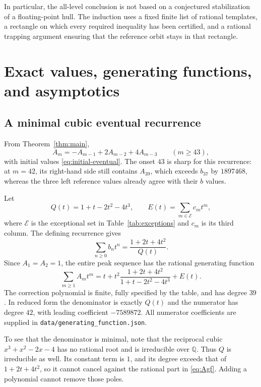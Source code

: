 \documentclass[11pt,a4paper]{article}
\theoremstyle{definition}\newtheorem{definition}[theorem]{Definition}
\theoremstyle{remark}\newtheorem{remark}[theorem]{Remark}
\newcommand{\Q}{\mathbb Q}
\begin{document}
In particular, the all-level conclusion is not based on a conjectured
stabilization of a floating-point hull. The induction uses a fixed finite
list of rational templates, a rectangle on which every required inequality
has been certified, and a rational trapping argument ensuring that the
reference orbit stays in that rectangle.

\section{Exact values, generating functions, and asymptotics}
\label{sec:consequences}

\subsection{A minimal cubic eventual recurrence}
From Theorem~\ref{thm:main},
\begin{equation}
 A_m=-A_{m-1}+2A_{m-2}+4A_{m-3}\qquad(m\ge43),
 \label{eq:peak-recurrence}
\end{equation}
with initial values \eqref{eq:initial-eventual}. The onset $43$ is sharp
for this recurrence: at $m=42$, its right-hand side still contains $A_{39}$,
which exceeds $b_{37}$ by $1897468$, whereas the three left reference values
already agree with their $b$ values.

Let
\begin{equation}
 Q(t)=1+t-2t^2-4t^3,\qquad
 E(t)=\sum_{m\in\mathcal E}c_mt^m,
 \label{eq:Q}
\end{equation}
where $\mathcal E$ is the exceptional set in Table~\ref{tab:exceptions}
and $c_m$ is its third column. The defining recurrence gives
\begin{equation}
 \sum_{n\ge0}b_nt^n=\frac{1+2t+4t^2}{Q(t)}.
 \label{eq:Bgf}
\end{equation}
Since $A_1=A_2=1$, the entire peak sequence has the rational generating
function
\begin{equation}
 \boxed{\quad
 \sum_{m\ge1}A_mt^m
 =t+t^2\frac{1+2t+4t^2}{1+t-2t^2-4t^3}+E(t).
 \quad}
 \label{eq:Agf}
\end{equation}
The correction polynomial is finite, fully specified by the table, and has
degree $39$. In reduced form the denominator is exactly $Q(t)$ and the
numerator has degree $42$, with leading coefficient $-7589872$.
All numerator coefficients are supplied in
\texttt{data/generating\_function.json}.

To see that the denominator is minimal, note that the reciprocal cubic
$x^3+x^2-2x-4$ has no rational root and is irreducible over $\Q$.
Thus $Q$ is irreducible as well. Its constant term is $1$, and its degree
exceeds that of $1+2t+4t^2$, so it cannot cancel against the rational part
in \eqref{eq:Agf}. Adding a polynomial cannot remove those poles.
\end{document}
